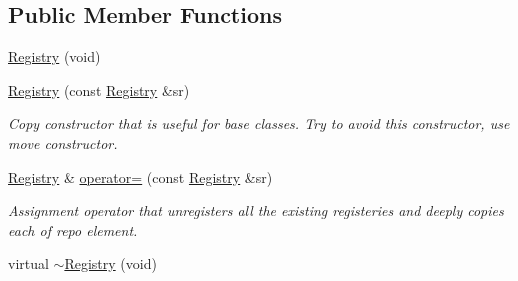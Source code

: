 \subsection*{Public Member Functions}
\begin{DoxyCompactItemize}
\item 
\hyperlink{classel_1_1base_1_1utils_1_1_registry_aa4bb56a1aff481cc6cf8979b2f2c6eca}{Registry} (void)
\item 
\hyperlink{classel_1_1base_1_1utils_1_1_registry_adf5e97aa801be3b93e116ad645304759}{Registry} (const \hyperlink{classel_1_1base_1_1utils_1_1_registry}{Registry} \&sr)
\begin{DoxyCompactList}\small\item\em Copy constructor that is useful for base classes. Try to avoid this constructor, use move constructor. \end{DoxyCompactList}\item 
\hyperlink{classel_1_1base_1_1utils_1_1_registry}{Registry} \& \hyperlink{classel_1_1base_1_1utils_1_1_registry_a80e0ce12b7d0c24462b385fc7b3149e0}{operator=} (const \hyperlink{classel_1_1base_1_1utils_1_1_registry}{Registry} \&sr)
\begin{DoxyCompactList}\small\item\em Assignment operator that unregisters all the existing registeries and deeply copies each of repo element. \end{DoxyCompactList}\item 
virtual \hyperlink{classel_1_1base_1_1utils_1_1_registry_a79aa9dfa385e233bf619d44422f4992c}{$\sim$\+Registry} (void)
\end{DoxyCompactItemize}
